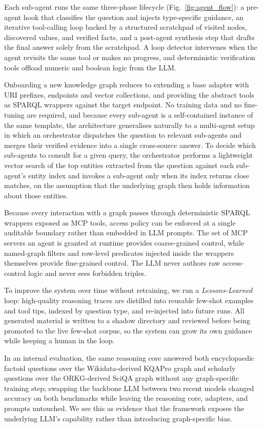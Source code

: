 \documentclass[sigconf,natbib=true]{ceurart}
\begin{document}
Each sub-agent runs the same three-phase lifecycle
(Fig.~\ref{fig:agent_flow}): a pre-agent hook that classifies the
question and injects type-specific guidance, an iterative
tool-calling loop backed by a structured scratchpad of visited nodes,
discovered values, and verified facts, and a post-agent synthesis step
that drafts the final answer solely from the scratchpad. A loop
detector intervenes when the agent revisits the same tool or makes no
progress, and deterministic verification tools offload numeric and
boolean logic from the LLM.



Onboarding a new knowledge graph reduces to extending a base adapter
with URI prefixes, endpoints and vector collections, and providing
the abstract tools as SPARQL wrappers against the target endpoint. No
training data and no fine-tuning are required, and because every
sub-agent is a self-contained instance of the same template, the
architecture generalises naturally to a multi-agent setup in which an
orchestrator dispatches the question to relevant sub-agents and
merges their verified evidence into a single cross-source answer. To
decide which sub-agents to consult for a given query, the
orchestrator performs a lightweight vector search of the top entities
extracted from the question against each sub-agent's entity index and
invokes a sub-agent only when its index returns close matches, on the
assumption that the underlying graph then holds information about
those entities.

Because every interaction with a graph passes through deterministic
SPARQL wrappers exposed as MCP tools, access policy can be enforced
at a single auditable boundary rather than embedded in LLM prompts.
The set of MCP servers an agent is granted at runtime provides
coarse-grained control, while named-graph filters and row-level
predicates injected inside the wrappers themselves provide
fine-grained control. The LLM never authors raw access-control
logic and never sees forbidden triples.

To improve the system over time without retraining, we run a
\emph{Lessons-Learned} loop: high-quality reasoning traces are
distilled into reusable few-shot examples and tool tips, indexed by
question type, and re-injected into future runs. All generated
material is written to a shadow directory and reviewed before being
promoted to the live few-shot corpus, so the system can grow its own
guidance while keeping a human in the loop.

In an internal evaluation, the same reasoning core answered both
encyclopaedic factoid questions over the Wikidata-derived KQAPro graph
and scholarly questions over the ORKG-derived SciQA graph without any
graph-specific training step; swapping the backbone LLM between two
recent models changed accuracy on both benchmarks while leaving the
reasoning core, adapters, and prompts untouched. We see this as
evidence that the framework exposes the underlying LLM's capability
rather than introducing graph-specific bias.
\end{document}

